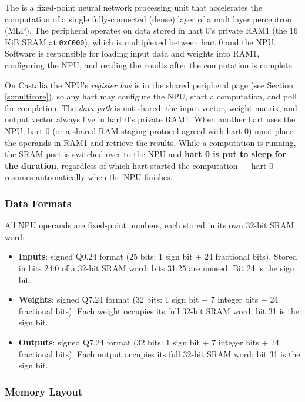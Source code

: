The  is a fixed-point neural network processing unit that accelerates the computation of a single fully-connected (dense) layer of a multilayer perceptron (MLP). The peripheral operates on data stored in hart 0's private RAM1 (the 16\,KiB SRAM at \texttt{0xC000}), which is multiplexed between hart 0 and the NPU. Software is responsible for loading input data and weights into RAM1, configuring the NPU, and reading the results after the computation is complete.

On Castalia the NPU's \textit{register bus} is in the shared peripheral page (see Section \ref{s:multicore}), so any hart may configure the NPU, start a computation, and poll for completion. The \textit{data path} is not shared: the input vector, weight matrix, and output vector always live in hart 0's private RAM1. When another hart uses the NPU, hart 0 (or a shared-RAM staging protocol agreed with hart 0) must place the operands in RAM1 and retrieve the results. While a computation is running, the SRAM port is switched over to the NPU and \textbf{hart 0 is put to sleep for the duration}, regardless of which hart started the computation --- hart 0 resumes automatically when the NPU finishes.

\subsubsection*{Data Formats}

All NPU operands are fixed-point numbers, each stored in its own 32-bit SRAM word:

\begin{itemize}
    \item \textbf{Inputs}: signed Q0.24 format (25 bits: 1 sign bit + 24 fractional bits). Stored in bits 24:0 of a 32-bit SRAM word; bits 31:25 are unused. Bit 24 is the sign bit.
    \item \textbf{Weights}: signed Q7.24 format (32 bits: 1 sign bit + 7 integer bits + 24 fractional bits). Each weight occupies its full 32-bit SRAM word; bit 31 is the sign bit.
    \item \textbf{Outputs}: signed Q7.24 format (32 bits: 1 sign bit + 7 integer bits + 24 fractional bits). Each output occupies its full 32-bit SRAM word; bit 31 is the sign bit.
\end{itemize}

\subsubsection*{Memory Layout}

